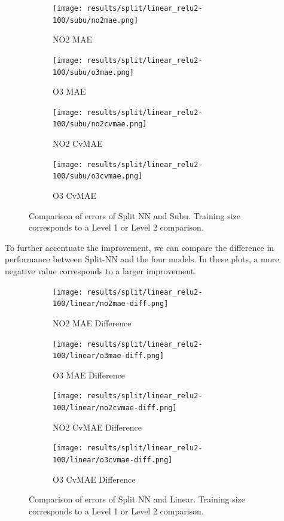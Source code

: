 \documentclass[journal abbreviation, manuscript]{copernicus}
\begin{document}
\begin{figure}[H]
\begin{subfigure}{0.49\textwidth}
\texttt{[image: results/split/linear\_relu2-100/subu/no2mae.png]}
\caption{NO2 MAE}
\end{subfigure}
\begin{subfigure}{0.49\textwidth}
\texttt{[image: results/split/linear\_relu2-100/subu/o3mae.png]}
\caption{O3 MAE}
\end{subfigure}
\begin{subfigure}{0.49\textwidth}
\texttt{[image: results/split/linear\_relu2-100/subu/no2cvmae.png]}
\caption{NO2 CvMAE}
\end{subfigure}
\begin{subfigure}{0.49\textwidth}
\texttt{[image: results/split/linear\_relu2-100/subu/o3cvmae.png]}
\caption{O3 CvMAE}
\end{subfigure}
\caption{Comparison of errors of Split NN and Subu. Training size corresponds to a Level 1 or Level 2 comparison.}
\end{figure}

To further accentuate the improvement, we can compare
the difference in performance between Split-NN and the four models. In these plots, a more negative value corresponds to a larger improvement.

\begin{figure}[H]
\begin{subfigure}{0.49\textwidth}
\texttt{[image: results/split/linear\_relu2-100/linear/no2mae-diff.png]}
\caption{NO2 MAE Difference}
\end{subfigure}
\begin{subfigure}{0.49\textwidth}
\texttt{[image: results/split/linear\_relu2-100/linear/o3mae-diff.png]}
\caption{O3 MAE Difference}
\end{subfigure}
\begin{subfigure}{0.49\textwidth}
\texttt{[image: results/split/linear\_relu2-100/linear/no2cvmae-diff.png]}
\caption{NO2 CvMAE Difference}
\end{subfigure}
\begin{subfigure}{0.49\textwidth}
\texttt{[image: results/split/linear\_relu2-100/linear/o3cvmae-diff.png]}
\caption{O3 CvMAE Difference}
\end{subfigure}
\caption{Comparison of errors of Split NN and Linear. Training size corresponds to a Level 1 or Level 2 comparison.}
\end{figure}
\end{document}
